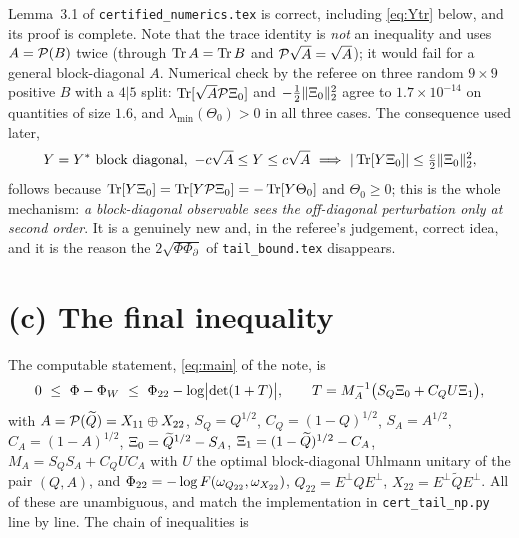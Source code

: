 \documentclass[11pt]{article}
\newcommand{\Qt}{\widetilde{Q}}\newcommand{\HS}{\mathfrak{S}_2}
\begin{document}
\begin{verdictok}
Lemma~3.1 of \texttt{certified\_numerics.tex} is correct, including \eqref{eq:Ytr} below, and its
proof is complete.  Note that the trace identity is \emph{not} an inequality and uses $A=\mathcal P(B)$
twice (through $\operatorname{Tr} A=\operatorname{Tr} B$ and $\mathcal P\sqrt A=\sqrt A$); it would fail for a general block-diagonal
$A$.  Numerical check by the referee on three random $9\times9$ positive $B$ with a $4|5$ split:
$\operatorname{Tr}[\sqrt A\mathcal P\Xi_0]$ and $-\frac12\|\Xi_0\|_2^2$ agree to $1.7\times10^{-14}$ on quantities of size
$1.6$, and $\lambda_{\min}(\Theta_0)>0$ in all three cases.  The consequence used later,
\begin{equation}\label{eq:Ytr}
 Y=Y^*\ \text{block diagonal},\ -c\sqrt A\le Y\le c\sqrt A\ \Longrightarrow\
 |\Tr[Y\Xo]|\le\tfrac c2\|\Xo\|_2^2,
\end{equation}
follows because $\operatorname{Tr}[Y\Xi_0]=\operatorname{Tr}[Y\mathcal P\Xi_0]=-\operatorname{Tr}[Y\Theta_0]$ and $\Theta_0\ge0$; this is the whole
mechanism: \emph{a block-diagonal observable sees the off-diagonal perturbation only at second
order}.  It is a genuinely new and, in the referee's judgement, correct idea, and it is the reason
the $2\sqrt{\Phi\Phi_\partial}$ of \texttt{tail\_bound.tex} disappears.
\end{verdictok}


\section{(c) The final inequality}\label{sec:c}

The computable statement, \eqref{eq:main} of the note, is
\begin{equation}\label{eq:main}
 0\ \le\ \Phi-\Phi_W\ \le\ \Phi_{22}-\log\bigl|\det(1+T)\bigr|,\qquad
 T=M_A^{-1}\bigl(S_Q\Xi_0+C_QU\Xi_1\bigr),
\end{equation}
with $A=\Pinch(\Qt)=X_{11}\oplus X_{22}$, $S_Q=Q^{1/2}$, $C_Q=(1-Q)^{1/2}$, $S_A=A^{1/2}$,
$C_A=(1-A)^{1/2}$, $\Xo=\Qt^{1/2}-S_A$, $\Xt=(1-\Qt)^{1/2}-C_A$, $M_A=S_QS_A+C_QUC_A$ with $U$ the
optimal block-diagonal Uhlmann unitary of the pair $(Q,A)$, and
$\Phi_{22}=-\log F(\omega_{Q_{22}},\omega_{X_{22}})$, $Q_{22}=E^\perp QE^\perp$,
$X_{22}=E^\perp\Qt E^\perp$.  All of these are unambiguous, and match the implementation in
\texttt{cert\_tail\_np.py} line by line.  The chain of inequalities is
\end{document}
